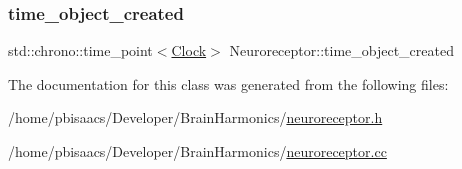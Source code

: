 \mbox{\label{classNeuroreceptor_a1ca4d66356d1e59850ea2d7591873ff5}} 
\subsubsection{\texorpdfstring{time\+\_\+object\+\_\+created}{time\_object\_created}}
{\footnotesize\ttfamily std\+::chrono\+::time\+\_\+point$<$\mbox{\hyperlink{universe_8h_a0ef8d951d1ca5ab3cfaf7ab4c7a6fd80}{Clock}}$>$ Neuroreceptor\+::time\+\_\+object\+\_\+created\hspace{0.3cm}{\ttfamily [private]}}



The documentation for this class was generated from the following files\+:\begin{DoxyCompactItemize}
\item 
/home/pbisaacs/\+Developer/\+Brain\+Harmonics/\mbox{\hyperlink{neuroreceptor_8h}{neuroreceptor.\+h}}\item 
/home/pbisaacs/\+Developer/\+Brain\+Harmonics/\mbox{\hyperlink{neuroreceptor_8cc}{neuroreceptor.\+cc}}\end{DoxyCompactItemize}
